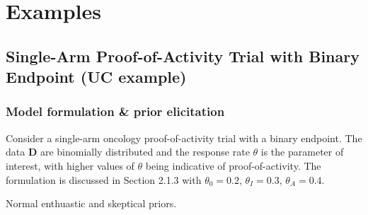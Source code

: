 \documentclass[12pt]{article}
\begin{document}
%


\newpage
\section{Examples}

\subsection{Single-Arm Proof-of-Activity Trial with Binary Endpoint (UC example)}

\subsubsection{Model formulation \& prior elicitation}

Consider a single-arm oncology proof-of-activity trial with a binary endpoint. The data $\mathbf{D}$ are binomially distributed and the response rate $\theta$ is the parameter of interest, with higher values of $\theta$ being indicative of proof-of-activity. The formulation is discussed in Section 2.1.3 with $\theta_0=0.2$, $\theta_I=0.3$, $\theta_A=0.4$.

Normal enthuastic and skeptical priors.

\end{document}
